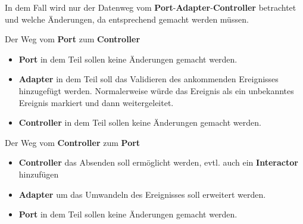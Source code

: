 In dem Fall wird nur der Datenweg vom \textbf{Port}-\textbf{Adapter}-\textbf{Controller} betrachtet und welche Änderungen,
da entsprechend gemacht werden müssen.

Der Weg vom \textbf{Port} zum \textbf{Controller}

\begin{itemize}
    \item \textbf{Port} in dem Teil sollen keine Änderungen gemacht werden.
    \item \textbf{Adapter} in dem Teil soll das Validieren des ankommenden Ereignisses hinzugefügt werden. Normalerweise würde 
    das Ereignis als ein unbekanntes Ereignis markiert und dann weitergeleitet.
    \item \textbf{Controller} in dem Teil sollen keine Änderungen gemacht werden.
\end{itemize}

Der Weg vom \textbf{Controller} zum \textbf{Port}
\begin{itemize}
    \item \textbf{Controller} das Absenden soll ermöglicht werden, evtl. auch ein \textbf{Interactor} hinzufügen
    \item \textbf{Adapter} um das Umwandeln des Ereignisses soll erweitert werden.
    \item \textbf{Port} in dem Teil sollen keine Änderungen gemacht werden.
\end{itemize}
